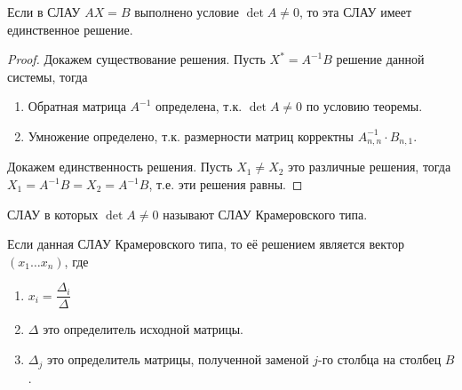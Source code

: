 \begin{theorem}[Крамера]
  Если в СЛАУ \(AX = B\) выполнено условие \(\det A \ne 0\), то эта СЛАУ имеет
  единственное решение.
\end{theorem}

\begin{proof}
  Докажем существование решения. Пусть \(X^* = A^{-1} B\) решение данной
  системы, тогда
  
  \begin{enumerate}
  \item
    Обратная матрица \(A^{-1}\) определена, т.к. \(\det A \ne 0\) по условию
    теоремы.
    
  \item
    Умножение определено, т.к. размерности матриц корректны \(A^{-1}_{n, n}
    \cdot B_{n, 1}\).
  \end{enumerate}
  
  Докажем единственность решения. Пусть \(X_1 \ne X_2\) это различные решения,
  тогда \(X_1 = A^{-1} B = X_2 = A^{-1} B\), т.е. эти решения равны.
\end{proof}

\begin{remark}
  СЛАУ в которых \(\det A \ne 0\) называют СЛАУ Крамеровского типа.
\end{remark}


Если данная СЛАУ Крамеровского типа, то её решением является вектор \((x_1
\dotsc x_n)\), где

\begin{enumerate}
\item
  \(x_i = \dfrac{\Delta_i}{\Delta}\)
  
\item
  \(\Delta\) это определитель исходной матрицы.
  
\item
  \(\Delta_j\) это определитель матрицы, полученной заменой \(j\)-го столбца на
  столбец \(B\).
\end{enumerate}
